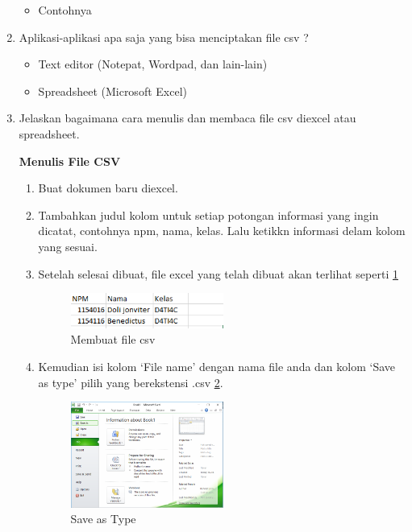 \begin{enumerate}
\begin{itemize}
     \item Contohnya

       
     \end{itemize}

 \item Aplikasi-aplikasi apa saja yang bisa menciptakan file csv ?

       \begin{itemize}
         \item Text editor (Notepat, Wordpad, dan lain-lain)
         \item Spreadsheet (Microsoft Excel)
       \end{itemize}

 \item Jelaskan bagaimana cara menulis dan membaca file csv diexcel atau spreadsheet.

    \textbf{Menulis File CSV}
       \begin{enumerate}
	   \item Buat dokumen baru diexcel.
       \item Tambahkan judul kolom untuk setiap potongan informasi yang ingin dicatat, contohnya npm, nama, kelas. Lalu ketikkn informasi delam kolom yang sesuai.
	   \item Setelah selesai dibuat, file excel yang telah dibuat akan terlihat seperti \ref{CSV}
		
		\begin{figure}[H]	\includegraphics[width=5cm]{figures/4/1154121/1.png}
		\centering
        \caption{Membuat file csv}
        \label{CSV}
		\end{figure}
		
	   \item Kemudian isi kolom `File name' dengan nama file anda dan kolom `Save as type' pilih yang berekstensi .csv \ref{save}.
		\begin{figure}[H] \includegraphics[width=5cm]{figures/4/1154121/2.png}
			\centering
        \caption{Save as Type}
        \label{save}
		\end{figure}


\end{enumerate}
\end{enumerate}

